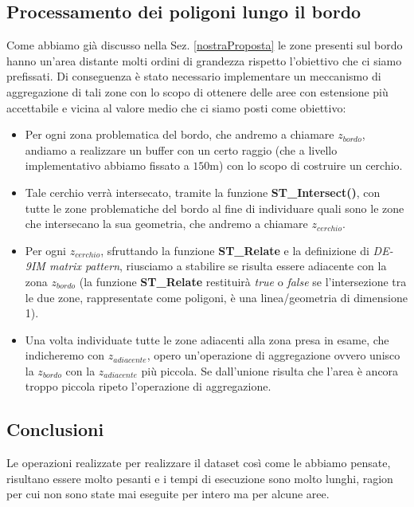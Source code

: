 \subsection{Processamento dei poligoni lungo il bordo}
Come abbiamo già discusso nella Sez. \ref{nostraProposta} le zone presenti sul bordo hanno un'area distante molti ordini di grandezza rispetto l'obiettivo che ci siamo prefissati. Di conseguenza è stato necessario implementare un meccanismo di aggregazione di tali zone con lo scopo di ottenere delle aree con estensione più accettabile e vicina al valore medio che ci siamo posti come obiettivo: \newline
\begin{itemize}
\item Per ogni zona problematica del bordo, che andremo a chiamare $z_{bordo}$, andiamo a realizzare un buffer con un certo raggio (che a livello implementativo abbiamo fissato a $150$m) con lo scopo di costruire un cerchio.
\item Tale cerchio verrà intersecato, tramite la funzione \textbf{ST\_Intersect()}, con tutte le zone problematiche del bordo al fine di individuare quali sono le zone che intersecano la sua geometria, che andremo a chiamare $z_{cerchio}$.
\item Per ogni $z_{cerchio}$, sfruttando la funzione \textbf{ST\_Relate} e la definizione di \textit{DE-9IM matrix pattern}, riusciamo a stabilire se risulta essere adiacente con la zona $z_{bordo}$ (la funzione \textbf{ST\_Relate} restituirà \textit{true} o \textit{false} se l'intersezione tra le due zone, rappresentate come poligoni, è una linea/geometria di dimensione 1).
\item Una volta individuate tutte le zone adiacenti alla zona presa in esame, che indicheremo con $z_{adiacente}$, opero un'operazione di aggregazione ovvero unisco la $z_{bordo}$ con la $z_{adiacente}$ più piccola. Se dall'unione risulta che l'area è ancora troppo piccola ripeto l'operazione di aggregazione.
\end{itemize}
\subsection{Conclusioni}
Le operazioni realizzate per realizzare il dataset così come le abbiamo pensate, risultano essere molto pesanti e i tempi di esecuzione sono molto lunghi, ragion per cui non sono state mai eseguite per intero ma per alcune aree. 
